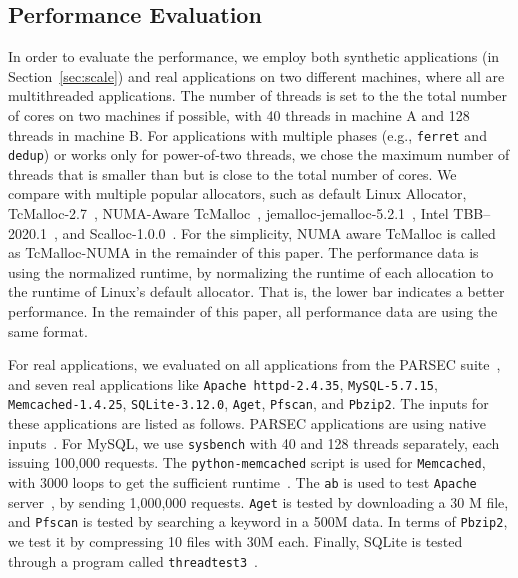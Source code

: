 \subsection{Performance Evaluation}

\label{sec:performance}

In order to evaluate the performance, we employ both synthetic applications (in Section~\ref{sec:scale}) and real applications on two different machines, where all are multithreaded applications. The number of threads is set to the the total number of cores on two machines if possible, with 40 threads in machine A and 128 threads in machine B. For applications with multiple phases (e.g., \texttt{ferret} and \texttt{dedup}) or works only for power-of-two threads, we chose the maximum number of threads that is smaller than but is close to the total number of cores.  We compare \NM{} with multiple popular allocators, such as default Linux Allocator, TcMalloc-2.7~\cite{tcmalloc}, NUMA-Aware TcMalloc~\cite{tcmallocnew}, jemalloc-jemalloc-5.2.1~\cite{jemalloc}, Intel TBB--2020.1~\cite{tbb}, and Scalloc-1.0.0~\cite{Scalloc}. For the simplicity, NUMA aware TcMalloc is called as TcMalloc-NUMA in the remainder of this paper. The performance data is using the normalized runtime, by normalizing the runtime of each allocation to the runtime of Linux's default   allocator. That is, the lower bar indicates a better performance. In the remainder of this paper, all performance data are using the same format. 

For real applications, we evaluated on all applications from the PARSEC suite~\cite{parsec}, and seven real applications like \texttt{Apache httpd-2.4.35}, \texttt{MySQL-5.7.15}, \texttt{Memcached-1.4.25}, \texttt{SQLite-3.12.0}, \texttt{Aget}, \texttt{Pfscan}, and \texttt{Pbzip2}. 
The inputs for these applications are listed as follows. PARSEC applications are using native inputs~\cite{parsec}. For MySQL, we use \texttt{sysbench} with 40 and 128 threads separately, each issuing 100,000  requests. The \texttt{python-memcached} script is used for \texttt{Memcached}, with 3000 loops to get the sufficient runtime~\cite{memcached}. The  \texttt{ab} is used to test \texttt{Apache} server~\cite{apachetest}, by sending 1,000,000 requests. \texttt{Aget} is tested  by downloading a 30 M file, and \texttt{Pfscan} is tested by searching  a keyword in a 500M data. In terms of \texttt{Pbzip2}, we test it by compressing 10 files with 30M each. Finally, SQLite is tested through a program called \texttt{threadtest3}~\cite{sqlitetest}. 


